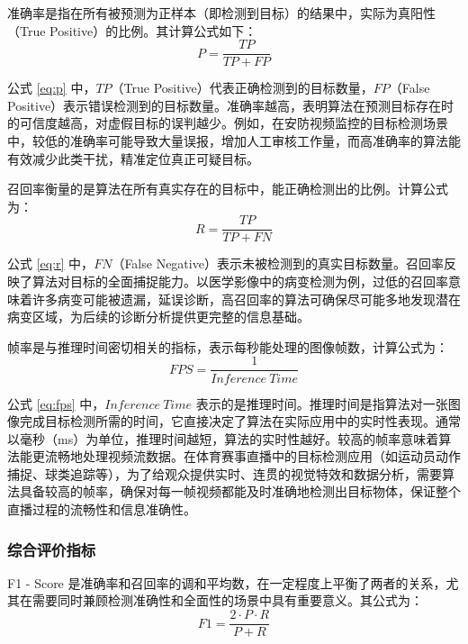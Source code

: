 准确率是指在所有被预测为正样本（即检测到目标）的结果中，实际为真阳性（True Positive）的比例。其计算公式如下：
\begin{equation}
    \label{eq:p}
    P = \frac{TP}{TP+FP}
\end{equation}

公式 \ref{eq:p} 中，$TP$（True Positive）代表正确检测到的目标数量，$FP$（False Positive）表示错误检测到的目标数量。准确率越高，表明算法在预测目标存在时的可信度越高，对虚假目标的误判越少。例如，在安防视频监控的目标检测场景中，较低的准确率可能导致大量误报，增加人工审核工作量，而高准确率的算法能有效减少此类干扰，精准定位真正可疑目标。


召回率衡量的是算法在所有真实存在的目标中，能正确检测出的比例。计算公式为：
\begin{equation}
    \label{eq:r}
    R = \frac{TP}{TP+FN}
\end{equation}

公式 \ref{eq:r} 中，$FN$（False Negative）表示未被检测到的真实目标数量。召回率反映了算法对目标的全面捕捉能力。以医学影像中的病变检测为例，过低的召回率意味着许多病变可能被遗漏，延误诊断，高召回率的算法可确保尽可能多地发现潜在病变区域，为后续的诊断分析提供更完整的信息基础。

帧率是与推理时间密切相关的指标，表示每秒能处理的图像帧数，计算公式为：
\begin{equation}
    \label{eq:fps}
    FPS = \frac{1}{Inference\ Time}
\end{equation}

公式 \ref{eq:fps} 中，$Inference\ Time$ 表示的是推理时间。推理时间是指算法对一张图像完成目标检测所需的时间，它直接决定了算法在实际应用中的实时性表现。通常以毫秒（ms）为单位，推理时间越短，算法的实时性越好。较高的帧率意味着算法能更流畅地处理视频流数据。在体育赛事直播中的目标检测应用（如运动员动作捕捉、球类追踪等），为了给观众提供实时、连贯的视觉特效和数据分析，需要算法具备较高的帧率，确保对每一帧视频都能及时准确地检测出目标物体，保证整个直播过程的流畅性和信息准确性。

\subsubsection{综合评价指标}

F1 - Score 是准确率和召回率的调和平均数，在一定程度上平衡了两者的关系，尤其在需要同时兼顾检测准确性和全面性的场景中具有重要意义。其公式为：
\begin{equation}
    \label{eq:f1}
    F1=\frac{2\cdot{P}\cdot{R}}{P+R}
\end{equation}

